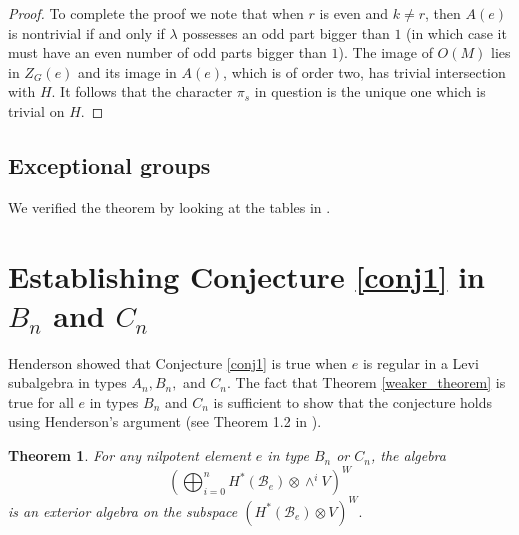 \documentclass[10pt]{amsart}
\newcommand{\flag}{{\mathcal B}}
\theoremstyle{plain}
\newtheorem{theorem}{Theorem}
\theoremstyle{definition}
\theoremstyle{remark}
\begin{document}
\begin{proof}
To complete the proof we note that when $r$ is even and $k \neq r$, then $A(e)$ is nontrivial if and only if $\lambda$ possesses an odd part bigger than $1$ (in which case it must have an even number of odd parts bigger than $1$).   
The image of $O(M)$ lies in $Z_G(e)$ and its image in $A(e)$, which is of order two, has trivial intersection with $H$.  
It follows that the character $\pi_s$ in question is the unique one which is trivial on $H$.
\end{proof}

\subsection{Exceptional groups}  \label{exceptionals}

We verified the theorem by looking at the tables in \cite{bs:green}.  %

\section{Establishing Conjecture \ref{conj1} in $B_n$ and $C_n$}

Henderson \cite{henderson:exterior} showed that Conjecture \ref{conj1} is true when $e$ is regular in a Levi subalgebra in types $A_n, B_n,$ and $C_n$.  
The fact that Theorem \ref{weaker_theorem} is true for all $e$ in types $B_n$ and $C_n$ is sufficient
to show that the conjecture holds using Henderson's argument (see Theorem 1.2 in \cite{henderson:exterior}).

\begin{theorem}
For any nilpotent element $e$ in type $B_n$ or $C_n$, 
the algebra $$\displaystyle ( \bigoplus_{i=0}^n H^*(\flag_e) \otimes \wedge^i V)^W$$ is an exterior algebra on the subspace $(H^*(\flag_e) \otimes V)^W.$
\end{theorem}
\end{document}
